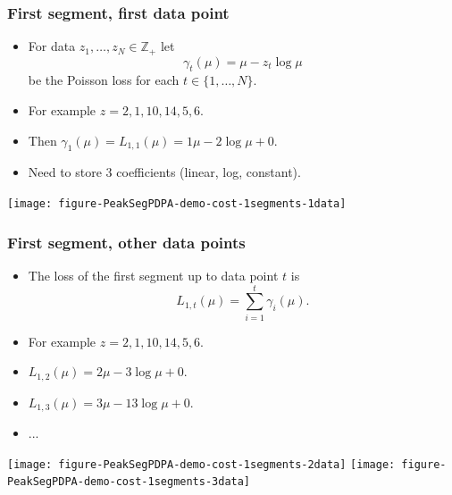 \documentclass{beamer}
\newcommand{\ZZ}{\mathbb Z}
\begin{document}
\begin{frame}
  \frametitle{First segment, first data point}
  \begin{itemize}
  \item   For data $z_1, \dots, z_N\in\ZZ_+$ let
  \begin{equation*}
    \gamma_t(\mu) = \mu - z_t \log \mu
  \end{equation*}
  be the Poisson loss for each $t\in\{1, \dots, N\}$.
\item For example $z = 2, 1, 10, 14, 5, 6$.
\item Then $\gamma_1(\mu)=L_{1,1}(\mu)= 1\mu - 2\log \mu + 0$.
\item Need to store 3 coefficients (linear, log, constant).
  \end{itemize}
  \begin{center}
    \texttt{[image: figure-PeakSegPDPA-demo-cost-1segments-1data]}
  \end{center}
\end{frame}

\begin{frame}
  \frametitle{First segment, other data points}
  \begin{itemize}
\item
  The loss of the first segment up to data point $t$ is
  \begin{equation*}
    \label{eq:C1b}
    L_{1,t}(\mu) = \sum_{i=1}^t \gamma_i(\mu).
  \end{equation*}
\item For example $z = 2, 1, 10, 14, 5, 6$.
\item $L_{1,2}(\mu) = 2\mu - 3\log\mu + 0$.
\item $L_{1,3}(\mu) = 3\mu - 13\log\mu + 0$.
\item ...
  \end{itemize}
  \begin{center}
    \texttt{[image: figure-PeakSegPDPA-demo-cost-1segments-2data]}
    \texttt{[image: figure-PeakSegPDPA-demo-cost-1segments-3data]}
  \end{center}
\end{frame}
\end{document}

